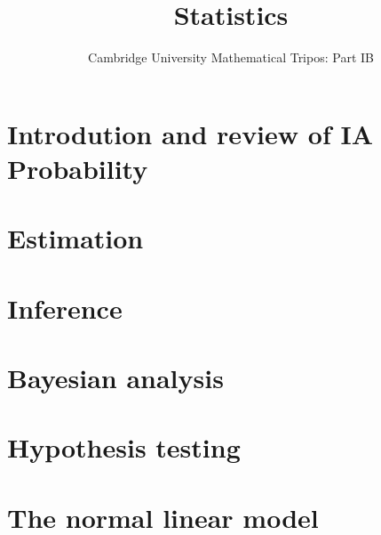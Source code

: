 \documentclass{article}
\title{Statistics}
\author{Cambridge University Mathematical Tripos: Part IB}
\begin{document}
\maketitle

\tableofcontentsnewpage{}

\section{Introdution and review of IA Probability}

\section{Estimation}

\section{Inference}

\section{Bayesian analysis}

\section{Hypothesis testing}

\section{The normal linear model}

\end{document}
